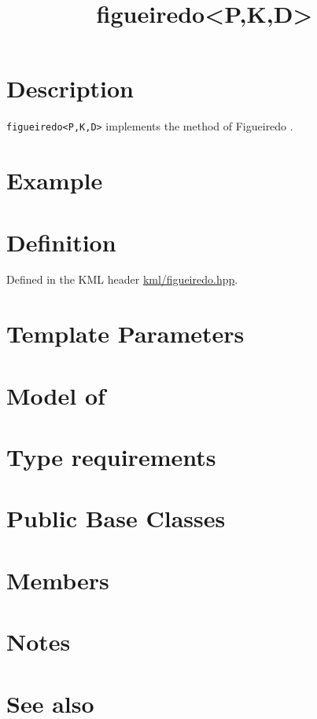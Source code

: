 \documentclass{article}
\begin{document}
\title{figueiredo<P,K,D>}
\maketitle

\section*{Description}

\texttt{figueiredo<P,K,D>} implements the method of Figueiredo \cite{figueiredo01adaptive,figueiredo03adaptive}.

\section*{Example}
\section*{Definition}

Defined in the KML header \href{\kmlsvnroot/kml/figueiredo.hpp}{kml/figueiredo.hpp}.

\section*{Template Parameters}
\section*{Model of}
\section*{Type requirements}
\section*{Public Base Classes}
\section*{Members}
\section*{Notes}
\section*{See also}



\end{document}
